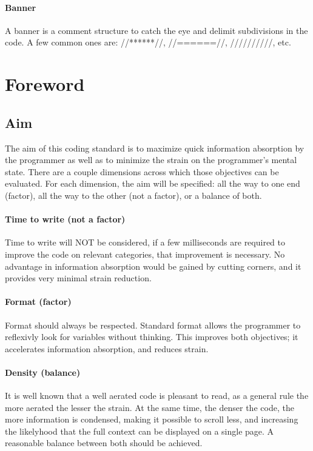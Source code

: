 \documentclass{article}
\begin{document}
\paragraph{Banner} A banner is a comment structure to catch the eye and delimit subdivisions in the code. A few common ones are: //******//, //======//, //////////, etc.
\pagebreak
\section{Foreword}
\subsection{Aim}
The aim of this coding standard is to maximize quick information absorption by the programmer as well as to minimize the strain on the programmer's mental state. There are a couple dimensions across which those objectives can be evaluated. For each dimension, the aim will be specified: all the way to one end (factor), all the way to the other (not a factor), or a balance of both.

\paragraph{Time to write (not a factor)} Time to write will NOT be considered, if a few milliseconds are required to improve the code on relevant categories, that improvement is necessary. No advantage in information absorption would be gained by cutting corners, and it provides very minimal strain reduction.

\paragraph{Format (factor)} Format should always be respected. Standard format allows the programmer to reflexivly look for variables without thinking. This improves both objectives; it accelerates information absorption, and reduces strain.

\paragraph{Density (balance)} It is well known that a well aerated code is pleasant to read, as a general rule the more aerated the lesser the strain. At the same time, the denser the code, the more information is condensed, making it possible to scroll less, and increasing the likelyhood that the full context can be displayed on a single page. A reasonable balance between both should be achieved.
\end{document}
